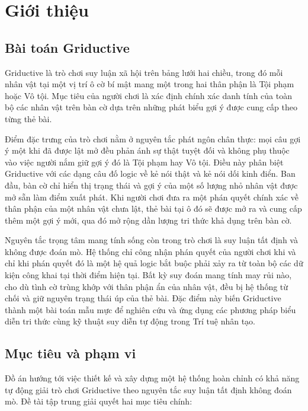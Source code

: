 \chapter{Giới thiệu}
\label{chap:gioi-thieu}

\section{Bài toán Griductive}
\label{sec:bai-toan-griductive}

Griductive là trò chơi suy luận xã hội trên bảng lưới hai chiều, trong đó mỗi nhân vật tại một vị trí ô cờ bí mật mang một trong hai thân phận là Tội phạm hoặc Vô tội. Mục tiêu của người chơi là xác định chính xác danh tính của toàn bộ các nhân vật trên bàn cờ dựa trên những phát biểu gợi ý được cung cấp theo từng thẻ bài.

Điểm đặc trưng của trò chơi nằm ở nguyên tắc phát ngôn chân thực: mọi câu gợi ý một khi đã được lật mở đều phản ánh sự thật tuyệt đối và không phụ thuộc vào việc người nắm giữ gợi ý đó là Tội phạm hay Vô tội. Điều này phân biệt Griductive với các dạng câu đố logic về kẻ nói thật và kẻ nói dối kinh điển. Ban đầu, bàn cờ chỉ hiển thị trạng thái và gợi ý của một số lượng nhỏ nhân vật được mở sẵn làm điểm xuất phát. Khi người chơi đưa ra một phán quyết chính xác về thân phận của một nhân vật chưa lật, thẻ bài tại ô đó sẽ được mở ra và cung cấp thêm một gợi ý mới, qua đó mở rộng dần lượng tri thức khả dụng trên bàn cờ.

Nguyên tắc trọng tâm mang tính sống còn trong trò chơi là suy luận tất định và không được đoán mò. Hệ thống chỉ công nhận phán quyết của người chơi khi và chỉ khi phán quyết đó là một hệ quả logic bắt buộc phải xảy ra từ toàn bộ các dữ kiện công khai tại thời điểm hiện tại. Bất kỳ suy đoán mang tính may rủi nào, cho dù tình cờ trùng khớp với thân phận ẩn của nhân vật, đều bị hệ thống từ chối và giữ nguyên trạng thái úp của thẻ bài. Đặc điểm này biến Griductive thành một bài toán mẫu mực để nghiên cứu và ứng dụng các phương pháp biểu diễn tri thức cùng kỹ thuật suy diễn tự động trong Trí tuệ nhân tạo.

\section{Mục tiêu và phạm vi}
\label{sec:muc-tieu-pham-vi}

Đồ án hướng tới việc thiết kế và xây dựng một hệ thống hoàn chỉnh có khả năng tự động giải trò chơi Griductive theo nguyên tắc suy luận tất định không đoán mò. Đề tài tập trung giải quyết hai mục tiêu chính:

